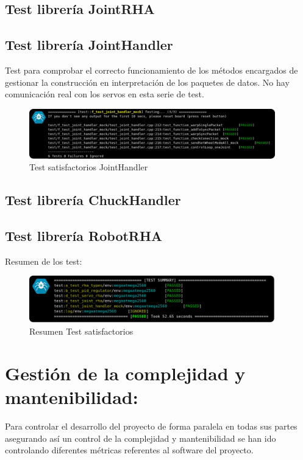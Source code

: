 	\subsection{Test librería JointRHA}
	\subsection{Test librería JointHandler}
		Test para comprobar el correcto funcionamiento de los métodos encargados de gestionar la construcción en interpretación de los paquetes de datos. No hay comunicación real con los servos en esta serie de test.
		\begin{figure}[H]
			\centering
			\includegraphics[width=0.95\textwidth]{figuras/Imagenes_SW/test/SWTest_5.jpg}
			\caption{Test satisfactorios JointHandler}
			\label{fig:SW:test:joint_handler_ok}
		\end{figure}
	\subsection{Test librería ChuckHandler}
	\subsection{Test librería RobotRHA}

	Resumen de los test:
	\begin{figure}[H]
		\centering
		\includegraphics[width=0.95\textwidth]{figuras/Imagenes_SW/test/SWTest_8.jpg}
		\caption{Resumen Test satisfactorios}
		\label{fig:SW:test:sum_ok}
	\end{figure}

\section{Gestión de la complejidad y mantenibilidad:} \label{sec:SW:gestion_complejidad}
    Para controlar el desarrollo del proyecto de forma paralela en todas sus partes asegurando así un control de la complejidad y mantenibilidad se han ido controlando diferentes métricas referentes al software del proyecto.
    \\

